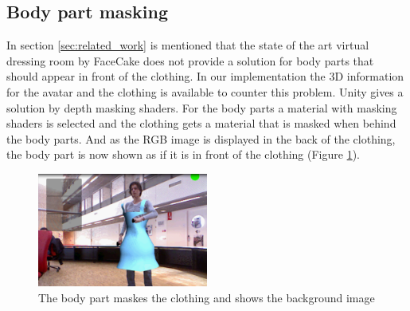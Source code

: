 \documentclass[twocolumn,a4paper]{article}
\begin{document}
\subsection{Body part masking}
\label{sec:bodypart_masking}
In section \ref{sec:related_work} is mentioned that the state of the art virtual dressing room by FaceCake does not provide a solution for body parts that should appear in front of the clothing. In our implementation the 3D information for the avatar and the clothing is available to counter this problem. Unity gives a solution by depth masking shaders. For the body parts a material with masking shaders is selected and the clothing gets a material that is masked when behind the body parts. And as the RGB image is displayed in the back of the clothing, the body part is now shown as if it is in front of the clothing (Figure \ref{fig:shader}).

 \begin{figure}[htp]
\centering
\includegraphics[width=0.5\textwidth]{show_shader_morris.png} 
\caption{The body part maskes the clothing and shows the background image}
\label{fig:shader}
\end{figure}
\end{document}
